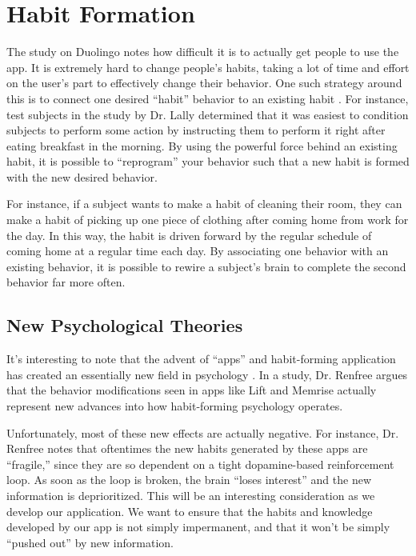 \section{Habit Formation}



The study on Duolingo notes how difficult it is to actually get people to use the app. It is extremely hard to change people's habits, taking a lot of time and effort on the user's part to effectively change their behavior. One such strategy around this is to connect one desired ``habit'' behavior to an existing habit \cite{lally2010habits}. For instance, test subjects in the study by Dr. Lally determined that it was easiest to condition subjects to perform some action by instructing them to perform it right after eating breakfast in the morning. By using the powerful force behind an existing habit, it is possible to ``reprogram'' your behavior such that a new habit is formed with the new desired behavior.

For instance, if a subject wants to make a habit of cleaning their room, they can make a habit of picking up one piece of clothing after coming home from work for the day. In this way, the habit is driven forward by the regular schedule of coming home at a regular time each day. By associating one behavior with an existing behavior, it is possible to rewire a subject's brain to complete the second behavior far more often.

\subsection{New Psychological Theories}
It's interesting to note that the advent of ``apps'' and habit-forming application has created an essentially new field in psychology \cite{renfree2016don}. In a study, Dr. Renfree argues that the behavior modifications seen in apps like Lift and Memrise actually represent new advances into how habit-forming psychology operates.

Unfortunately, most of these new effects are actually negative. For instance, Dr. Renfree notes that oftentimes the new habits generated by these apps are ``fragile,'' since they are so dependent on a tight dopamine-based reinforcement loop. As soon as the loop is broken, the brain ``loses interest'' and the new 
information is deprioritized. This will be an interesting consideration as we develop our application. We want to ensure that the habits and knowledge developed by our app is not simply impermanent, and that it won't be simply ``pushed out'' by new information.




